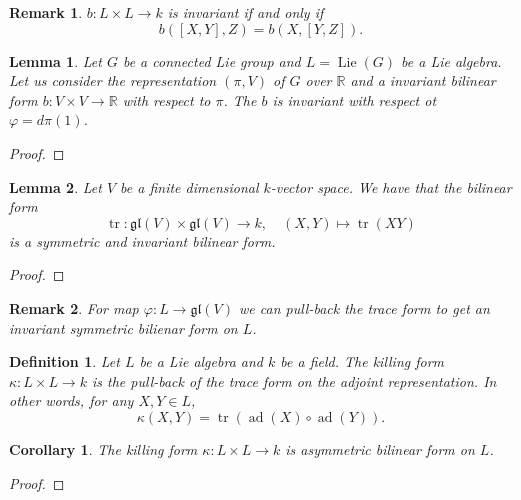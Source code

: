 \documentclass{article}
\newtheorem{definition}{Definition}[section]
\newtheorem{lemma}{Lemma}[section]
\newtheorem{remark}{Remark}[section]
\newtheorem{corollary}{Corollary}[section]
\numberwithin{equation}{section}
\DeclareMathOperator{\ad}{ad}
\DeclareMathOperator{\Lie}{Lie}
\DeclareMathOperator{\tr}{tr}
\begin{document}
\begin{remark}
$b:L\times L\to k$ is invariant if and only if 
\begin{equation*}
b([X,Y],Z) = b(X,[Y,Z]).
\end{equation*}
\end{remark}

\begin{lemma}
Let $G$ be a connected Lie group and $L=\Lie(G)$ be a Lie algebra. Let us consider the representation $(\pi,V)$ of $G$ over $\mathbb{R}$ and a invariant bilinear form $b:V\times V\to \mathbb{R}$ with respect to $\pi$. The $b$ is invariant with respect ot $\varphi = d\pi(1)$.
\end{lemma}

\begin{proof}
\end{proof}

\begin{lemma}
Let $V$ be a finite dimensional $k$-vector space. We have that the bilinear form
\begin{equation*}
\tr:\mathfrak{gl}(V)\times\mathfrak{gl}(V)\to k, \quad (X,Y)\mapsto \tr(XY)
\end{equation*}
is a symmetric and invariant bilinear form. %
\end{lemma}

\begin{proof}
\end{proof}

\begin{remark}
For map $\varphi:L\to \mathfrak{gl}(V)$ we can pull-back the trace form to get an invariant symmetric bilienar form on $L$. %
\end{remark}

\begin{definition}
Let $L$ be a Lie algebra and $k$ be a field. The killing form $\kappa:L\times L\to k$ is the pull-back of the trace form on the adjoint representation. In other words, for any $X,Y\in L$, 
\begin{equation*}
\kappa(X,Y) = \tr(\ad(X)\circ\ad(Y)).
\end{equation*}
\end{definition}

\begin{corollary}
The killing form $\kappa:L\times L\to k$ is asymmetric bilinear form on $L$. %
\end{corollary}

\begin{proof}
\end{proof}
\end{document}

